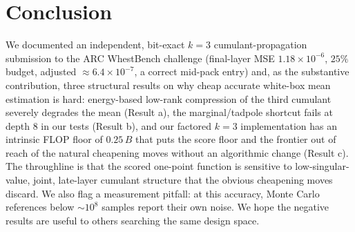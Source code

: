 \documentclass[11pt]{article}
\theoremstyle{remark}
\begin{document}
\section{Conclusion}
We documented an independent, bit-exact $k{=}3$ cumulant-propagation submission
to the ARC WhestBench challenge (final-layer MSE $1.18\times10^{-6}$, $25\%$
budget, adjusted $\approx6.4\times10^{-7}$, a correct mid-pack entry) and, as
the substantive contribution, three structural results on why cheap accurate
white-box mean estimation is hard: energy-based low-rank compression of the
third cumulant severely degrades the mean (Result a), the marginal/tadpole
shortcut fails at depth $8$ in our tests (Result b), and our factored $k{=}3$
implementation has an intrinsic FLOP floor of $0.25\,B$ that puts the score
floor and the frontier out of reach of the natural cheapening moves without an
algorithmic change (Result c). The throughline is that the scored one-point
function is sensitive to low-singular-value, joint, late-layer cumulant structure
that the obvious cheapening moves discard. We also flag a measurement pitfall: at this
accuracy, Monte Carlo references below $\sim\!10^8$ samples report their own
noise. We hope the negative results are useful to others searching the same
design space.



\end{document}
